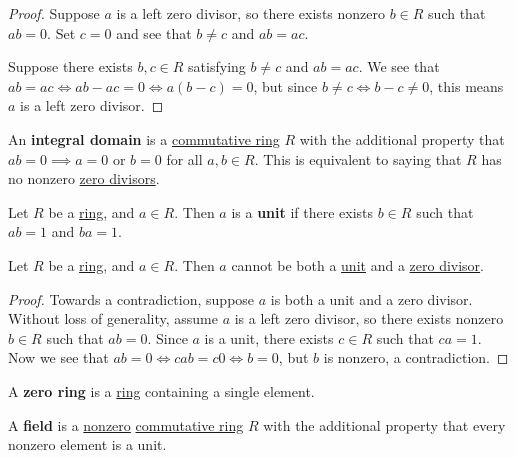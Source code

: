 \documentclass{scrartcl}
\begin{document}
\begin{proof}
    Suppose $a$ is a left zero divisor, so there exists nonzero $b\in R$ such that $ab=0$.
    Set $c=0$ and see that $b\neq c$ and $ab=ac$.

    Suppose there exists $b,c\in R$ satisfying $b\neq c$ and $ab=ac$.
    We see that $ab=ac\iff ab-ac=0\iff a(b-c)=0$, but since $b\neq c\iff b-c\neq 0$, this means $a$ is a left zero
    divisor.
\end{proof}

\begin{definition}
    An \textbf{integral domain} is a \hyperref[def:commutative ring]{commutative ring} $R$ with the additional property
    that $ab=0\implies a=0\text{ or }b=0$ for all $a,b\in R$.
    This is equivalent to saying that $R$ has no nonzero \hyperref[def:zero divisor]{zero divisors}.
\end{definition}

\begin{definition}[Unit]
    \label{def:unit}
    Let $R$ be a \hyperref[def:ring]{ring}, and $a\in R$.
    Then $a$ is a \textbf{unit} if there exists $b\in R$ such that $ab=1$ and $ba=1$.
\end{definition}

\begin{proposition}
    Let $R$ be a \hyperref[def:ring]{ring}, and $a\in R$.
    Then $a$ cannot be both a \hyperref[def:unit]{unit} and a \hyperref[def:zero divisor]{zero divisor}.
\end{proposition}

\begin{proof}
    Towards a contradiction, suppose $a$ is both a unit and a zero divisor.
    Without loss of generality, assume $a$ is a left zero divisor, so there exists nonzero $b\in R$ such that $ab=0$.
    Since $a$ is a unit, there exists $c\in R$ such that $ca=1$.
    Now we see that $ab=0\iff cab=c0\iff b=0$, but $b$ is nonzero, a contradiction.
\end{proof}

\begin{definition}
    \label{def:nonzero ring}
    A \textbf{zero ring} is a \hyperref[def:ring]{ring} containing a single element.
\end{definition}

\begin{definition}[Field]
    \label{def:field}
    A \textbf{field} is a \hyperref[def:nonzero ring]{nonzero} \hyperref[def:commutative ring]{commutative ring} $R$
    with the additional property that every nonzero element is a unit.
\end{definition}
\end{document}
